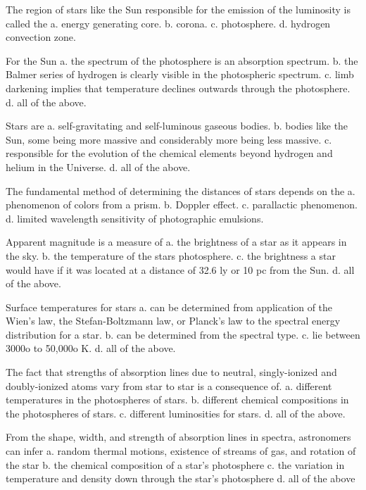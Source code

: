     The region of stars like the Sun responsible for the emission of the luminosity is called the
    a. energy generating core.
    b. corona.
    c. photosphere.
    d. hydrogen convection zone.

    For the Sun
    a. the spectrum of the photosphere is an absorption spectrum.
    b. the Balmer series of hydrogen is clearly visible in the photospheric spectrum.
    c. limb darkening implies that temperature declines outwards through the photosphere.
    d. all of the above.

    Stars are
    a. self-gravitating and self-luminous gaseous bodies.
    b. bodies like the Sun, some being more massive and considerably more being less massive.
    c. responsible for the evolution of the chemical elements beyond hydrogen and helium in the Universe.
    d. all of the above.

    The fundamental method of determining the distances of stars depends on the
    a. phenomenon of colors from a prism.
    b. Doppler effect.
    c. parallactic phenomenon.
    d. limited wavelength sensitivity of photographic emulsions.

    Apparent magnitude is a measure of
    a. the brightness of a star as it appears in the sky.
    b. the temperature of the stars photosphere.
    c. the brightness a star would have if it was located at a distance of 32.6 ly or 10 pc from the Sun.
    d. all of the above.

    Surface temperatures for stars
    a. can be determined from application of the Wien's law, the Stefan-Boltzmann law, or Planck's law to the spectral energy distribution for a star.
    b. can be determined from the spectral type.
    c. lie between 3000o to 50,000o K.
    d. all of the above.

    The fact that strengths of absorption lines due to neutral, singly-ionized and doubly-ionized atoms vary from star to star is a consequence of.
    a. different temperatures in the photospheres of stars.
    b. different chemical compositions in the photospheres of stars.
    c. different luminosities for stars.
    d. all of the above.

    From the shape, width, and strength of absorption lines in spectra, astronomers can infer
    a. random thermal motions, existence of streams of gas, and rotation of the star
    b. the chemical composition of a star's photosphere
    c. the variation in temperature and density down through the star's photosphere
    d. all of the above

